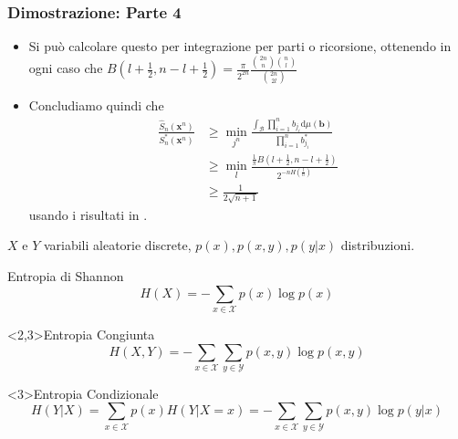 \documentclass{beamer}
\theoremstyle{plain}
\theoremstyle{definition}
\theoremstyle{remark}
\newcommand{\x}{\bm{x}}
\newcommand{\B}{\bm{b}}
\newcommand{\Sh}{\hat{S}}
\newcommand{\dmu}{\text{d}\mu(\B)}
\begin{document}
\begin{frame}
\frametitle{Dimostrazione: Parte 4}
\begin{itemize}
\item Si può calcolare questo per integrazione per parti o ricorsione, ottenendo in ogni caso che $B\left(l+\frac{1}{2},n-l+\frac{1}{2}\right)=\frac{\pi}{2^{2n}}\frac{\binom{2n}{n}\binom{n}{l}}{\binom{2n}{2l}}$
\item Concludiamo quindi che
\begin{equation*}
\begin{split}
\frac{\Sh_n(\x^n)}{S_n^*(\x^n)}&\geq \min\limits_{j^n}\frac{\int_\mathcal{B}{\prod_{i = 1}^n{b_{j_i}\dmu}}}{\prod_{i = 1}^n{b^*_{j_i}}}\\
& \geq \min\limits_l \frac{\frac{1}{\pi}B\left(l+\frac{1}{2},n-l+\frac{1}{2}\right)}{2^{-nH\left(\frac{l}{n}\right)}}\\
& \geq \frac{1}{2\sqrt{n+1}}
\end{split}
\end{equation*}
usando i risultati in \cite{CoverOrden1996}.
\end{itemize}
\hyperlink{UnivInf}{}
\end{frame}


\begin{frame}[label=InfTeo]
$X$ e $Y$ variabili aleatorie discrete, $p(x),p(x,y),p(y|x)$ distribuzioni.
\begin{block}{Entropia di Shannon}
	\begin{equation*}
	H(X) = -\sum_{x\in \mathcal{X}}{p(x)\log p(x)}
	\end{equation*}
\end{block}
\begin{block}<2,3>{Entropia Congiunta}
	\begin{equation*}	
	H(X,Y) = -\sum_{x\in \mathcal{X}}\sum_{y\in \mathcal{Y}}{p(x,y)\log p(x,y)}
	\end{equation*}
\end{block}
\begin{block}<3>{Entropia Condizionale}
	\begin{equation*}
	H(Y|X) =\sum_{x\in \mathcal{X}}{p(x)H(Y|X = x)}=-\sum_{x\in \mathcal{X}}\sum_{y\in \mathcal{Y}}{p(x,y)\log p(y|x)}
	\end{equation*}
\end{block}
\end{frame}
\end{document}
